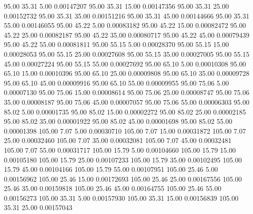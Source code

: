      95.00     35.31      5.00     0.00147207
     95.00     35.31     15.00     0.00147356
     95.00     35.31     25.00     0.00152732
     95.00     35.31     35.00     0.00151216
     95.00     35.31     45.00     0.00144666
     95.00     35.31     55.00     0.00146055
     95.00     45.22      5.00     0.00083182
     95.00     45.22     15.00     0.00082472
     95.00     45.22     25.00     0.00082187
     95.00     45.22     35.00     0.00080717
     95.00     45.22     45.00     0.00079439
     95.00     45.22     55.00     0.00081811
     95.00     55.15      5.00     0.00028370
     95.00     55.15     15.00     0.00028053
     95.00     55.15     25.00     0.00027608
     95.00     55.15     35.00     0.00027005
     95.00     55.15     45.00     0.00027224
     95.00     55.15     55.00     0.00027692
     95.00     65.10      5.00     0.00010308
     95.00     65.10     15.00     0.00010396
     95.00     65.10     25.00     0.00009808
     95.00     65.10     35.00     0.00009728
     95.00     65.10     45.00     0.00009916
     95.00     65.10     55.00     0.00009955
     95.00     75.06      5.00     0.00007130
     95.00     75.06     15.00     0.00008614
     95.00     75.06     25.00     0.00008747
     95.00     75.06     35.00     0.00008187
     95.00     75.06     45.00     0.00007057
     95.00     75.06     55.00     0.00006303
     95.00     85.02      5.00     0.00001735
     95.00     85.02     15.00     0.00002272
     95.00     85.02     25.00     0.00002185
     95.00     85.02     35.00     0.00001922
     95.00     85.02     45.00     0.00001698
     95.00     85.02     55.00     0.00001398
    105.00      7.07      5.00     0.00030710
    105.00      7.07     15.00     0.00031872
    105.00      7.07     25.00     0.00032460
    105.00      7.07     35.00     0.00032081
    105.00      7.07     45.00     0.00032481
    105.00      7.07     55.00     0.00031717
    105.00     15.79      5.00     0.00104660
    105.00     15.79     15.00     0.00105180
    105.00     15.79     25.00     0.00107233
    105.00     15.79     35.00     0.00102495
    105.00     15.79     45.00     0.00104166
    105.00     15.79     55.00     0.00107951
    105.00     25.46      5.00     0.00156962
    105.00     25.46     15.00     0.00172693
    105.00     25.46     25.00     0.00167556
    105.00     25.46     35.00     0.00159818
    105.00     25.46     45.00     0.00164755
    105.00     25.46     55.00     0.00156273
    105.00     35.31      5.00     0.00157930
    105.00     35.31     15.00     0.00156839
    105.00     35.31     25.00     0.00157043
